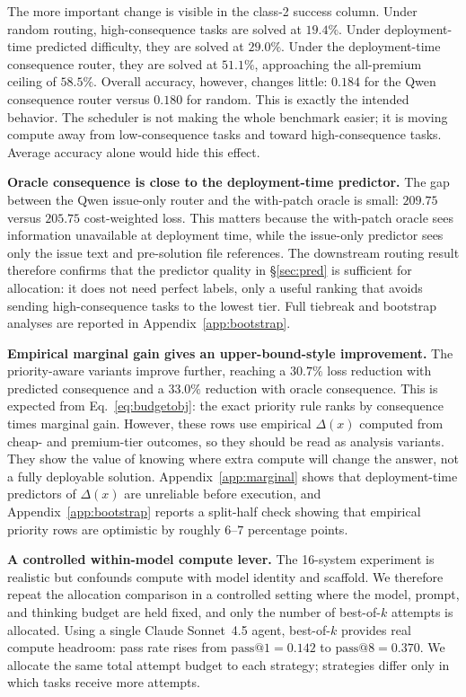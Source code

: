 \documentclass{article}
\begin{document}
The more important change is visible in the class-2 success column.
Under random routing, high-consequence tasks are solved at $19.4\%$.
Under deployment-time predicted difficulty, they are solved at
$29.0\%$. Under the deployment-time consequence router, they are solved
at $51.1\%$, approaching the all-premium ceiling of $58.5\%$. Overall
accuracy, however, changes little: $0.184$ for the Qwen consequence
router versus $0.180$ for random. This is exactly the intended behavior.
The scheduler is not making the whole benchmark easier; it is moving
compute away from low-consequence tasks and toward high-consequence
tasks. Average accuracy alone would hide this effect.

\textbf{Oracle consequence is close to the deployment-time predictor.}
The gap between the Qwen issue-only router and the with-patch oracle is
small: $209.75$ versus $205.75$ cost-weighted loss. This matters because
the with-patch oracle sees information unavailable at deployment time,
while the issue-only predictor sees only the issue text and pre-solution
file references. The downstream routing result therefore confirms that
the predictor quality in \S\ref{sec:pred} is sufficient for allocation:
it does not need perfect labels, only a useful ranking that avoids
sending high-consequence tasks to the lowest tier. Full tiebreak and
bootstrap analyses are reported in Appendix~\ref{app:bootstrap}.

\textbf{Empirical marginal gain gives an upper-bound-style improvement.}
The priority-aware variants improve further, reaching a $30.7\%$ loss
reduction with predicted consequence and a $33.0\%$ reduction with
oracle consequence. This is expected from Eq.~\ref{eq:budgetobj}: the
exact priority rule ranks by consequence times marginal gain. However,
these rows use empirical $\Delta(x)$ computed from cheap- and
premium-tier outcomes, so they should be read as analysis variants.
They show the value of knowing where extra compute will change the
answer, not a fully deployable solution. Appendix~\ref{app:marginal}
shows that deployment-time predictors of $\Delta(x)$ are unreliable
before execution, and Appendix~\ref{app:bootstrap} reports a split-half
check showing that empirical priority rows are optimistic by roughly
$6$--$7$ percentage points.

\textbf{A controlled within-model compute lever.}
The 16-system experiment is realistic but confounds compute with model
identity and scaffold. We therefore repeat the allocation comparison in
a controlled setting where the model, prompt, and thinking budget are
held fixed, and only the number of best-of-$k$ attempts is allocated.
Using a single Claude Sonnet~4.5 agent, best-of-$k$ provides real
compute headroom: pass rate rises from $\mathrm{pass@}1=0.142$ to
$\mathrm{pass@}8=0.370$. We allocate the same total attempt budget to
each strategy; strategies differ only in which tasks receive more
attempts.
\end{document}
